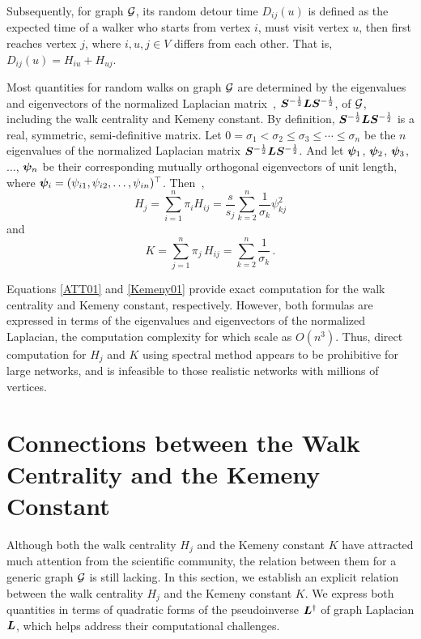 \documentclass[10pt,journal,compsoc,twocolumn,twoside]{IEEEtran}
\begin{document}
Subsequently, for graph \(\mathcal{G}\), its random detour time \(D_{ij}(u)\) is defined as the expected time of a walker who starts from vertex \(i\), must visit vertex \(u\), then first reaches vertex \(j\), where \(i,u,j\in V\) differs from each other.
That is, \(D_{ij}(u)= H_{iu}+H_{uj}\).

Most quantities for random walks on graph \(\mathcal{G}\) are determined by the eigenvalues and eigenvectors of the normalized Laplacian matrix~\cite{Ch97}, \({\boldsymbol{S}}^{-\frac{1}{2}}\boldsymbol{L} {\boldsymbol{S}}^{-\frac{1}{2}}\), of \(\mathcal{G}\), including the walk centrality and Kemeny constant. By definition, \({\boldsymbol{S}}^{-\frac{1}{2}}\boldsymbol{L} {\boldsymbol{S}}^{-\frac{1}{2}}\) is a real, symmetric, semi-definitive matrix. Let \(0=\sigma_1 < \sigma_2 \leq \sigma_3 \leq \cdots \leq \sigma_n \) be the \(n\) eigenvalues of the normalized Laplacian matrix \({\boldsymbol{S}}^{-\frac{1}{2}}\boldsymbol{L} {\boldsymbol{S}}^{-\frac{1}{2}}\). And let \(\boldsymbol{\psi}_1\), \(\boldsymbol{\psi}_2\), \(\boldsymbol{\psi}_3\), \(\ldots\), \(\boldsymbol{\psi}_n\) be their corresponding mutually orthogonal eigenvectors of unit length, where \(\boldsymbol{\psi}_i=(\psi_{i1},\psi_{i2},\ldots,\psi_{in})^{\top}\). Then~\cite{Lo93,Be16},
\begin{equation}\label{ATT01}
    H_j=\sum_{i=1}^{n} \pi_i H_{ij}=\frac{s}{s_j}\sum_{k=2}^{n}\frac{1}{\sigma_{k}}\psi_{kj}^{2}
\end{equation}
and
\begin{equation}\label{Kemeny01}
    K =\sum_{j=1}^{n}\pi_j\,H_{ij} =\sum_{k=2}^{n}\frac{1}{\sigma_{k}}\,.
\end{equation}

Equations \eqref{ATT01} and \eqref{Kemeny01} provide exact computation for the walk centrality and Kemeny constant, respectively. However, both formulas are expressed in terms of the eigenvalues and eigenvectors of the normalized Laplacian, the computation complexity for which scale as \(O(n^3)\). Thus, direct  computation for \(H_j\) and \(K\)  using spectral method appears to be prohibitive for large networks, and is infeasible to those realistic networks with millions of vertices.

\section{Connections between the Walk Centrality and the Kemeny Constant}

Although both the walk centrality \(H_j\) and the Kemeny constant \(K\) have attracted much attention from the scientific community, the relation between  them for a generic  graph  \(\mathcal{G}\) is still lacking.
In this section, we establish an explicit relation between the walk centrality \(H_j\) and the Kemeny constant \(K\).
We express both quantities in terms of quadratic forms of the pseudoinverse \(\boldsymbol{L}^{\dagger}\) of graph Laplacian \(\boldsymbol{L}\), which helps address their computational challenges.
\end{document}
